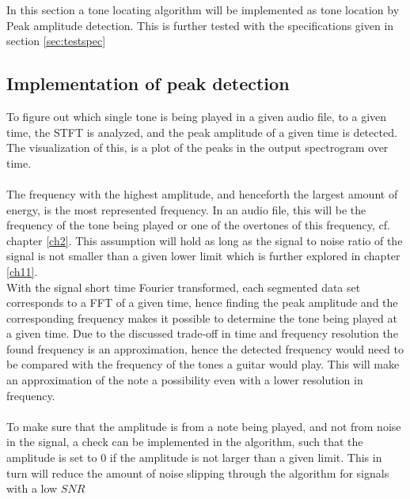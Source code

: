 \label{sec:peak_detection}
In this section a tone locating algorithm will be implemented as tone location by Peak amplitude detection.
This is further tested with the specifications given in section \ref{sec:testspec}
\subsection{Implementation of peak detection}
To figure out which single tone is being played in a given audio file, to a given time, the STFT is analyzed, and the peak amplitude of a given time is detected.
The visualization of this, is a plot of the peaks in the output spectrogram over time.\\
\\
The frequency with the highest amplitude, and henceforth the largest amount of energy, is the most represented frequency. 
In an audio file, this will be the frequency of the tone being played or one of the overtones of this frequency, cf. chapter \ref{ch2}.
This assumption will hold as long as the signal to noise ratio of the signal is not smaller than a given lower limit which is further explored in chapter \ref{ch11}.\\
With the signal short time Fourier transformed, each segmented data set corresponds to a FFT of a given time, hence finding the peak amplitude and the corresponding frequency makes it possible to determine the tone being played at a given time. Due to the discussed trade-off in time and frequency resolution the found frequency is an approximation, hence the detected frequency would need to be compared with the frequency of the tones a guitar would play. 
This will make an approximation of the note a possibility even with a lower resolution in frequency. \\
\\
To make sure that the amplitude is from a note being played, and not from noise in the signal, a check can be implemented in the algorithm, such that the amplitude is set to $0$ if the amplitude is not larger than a given limit.
This in turn will reduce the amount of noise slipping through the algorithm for signals with a low $SNR$


